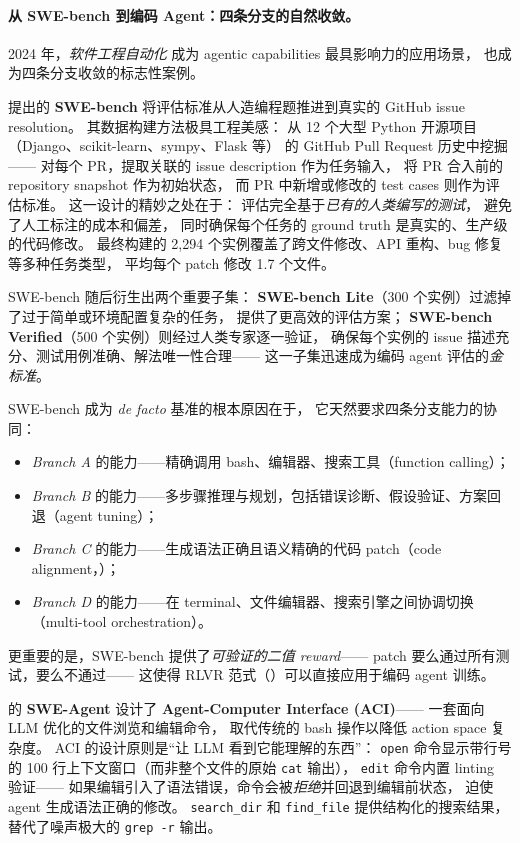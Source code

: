 \paragraph{从 SWE-bench 到编码 Agent：四条分支的自然收敛。}
2024 年，\emph{软件工程自动化} 成为 agentic capabilities 最具影响力的应用场景，
也成为四条分支收敛的标志性案例。

 提出的 \textbf{SWE-bench}
将评估标准从人造编程题推进到真实的 GitHub issue resolution。
其数据构建方法极具工程美感：
从 12 个大型 Python 开源项目（Django、scikit-learn、sympy、Flask 等）
的 GitHub Pull Request 历史中挖掘——
对每个 PR，提取关联的 issue description 作为任务输入，
将 PR 合入前的 repository snapshot 作为初始状态，
而 PR 中新增或修改的 test cases 则作为评估标准。
这一设计的精妙之处在于：
评估完全基于\emph{已有的人类编写的测试}，
避免了人工标注的成本和偏差，
同时确保每个任务的 ground truth 是真实的、生产级的代码修改。
最终构建的 2,294 个实例覆盖了跨文件修改、API 重构、bug 修复等多种任务类型，
平均每个 patch 修改 1.7 个文件。

SWE-bench 随后衍生出两个重要子集：
\textbf{SWE-bench Lite}（300 个实例）过滤掉了过于简单或环境配置复杂的任务，
提供了更高效的评估方案；
\textbf{SWE-bench Verified}（500 个实例）则经过人类专家逐一验证，
确保每个实例的 issue 描述充分、测试用例准确、解法唯一性合理——
这一子集迅速成为编码 agent 评估的\emph{金标准}。

SWE-bench 成为 \emph{de facto} 基准的根本原因在于，
它天然要求四条分支能力的协同：
\begin{itemize}[leftmargin=*]
  \item \emph{Branch A} 的能力——精确调用 bash、编辑器、搜索工具（function calling）；
  \item \emph{Branch B} 的能力——多步骤推理与规划，包括错误诊断、假设验证、方案回退（agent tuning）；
  \item \emph{Branch C} 的能力——生成语法正确且语义精确的代码 patch（code alignment，）；
  \item \emph{Branch D} 的能力——在 terminal、文件编辑器、搜索引擎之间协调切换（multi-tool orchestration）。
\end{itemize}
更重要的是，SWE-bench 提供了\emph{可验证的二值 reward}——
patch 要么通过所有测试，要么不通过——
这使得 RLVR 范式（）可以直接应用于编码 agent 训练。

\citet{yang2024sweagent} 的 \textbf{SWE-Agent}
设计了 \textbf{Agent-Computer Interface (ACI)}——
一套面向 LLM 优化的文件浏览和编辑命令，
取代传统的 bash 操作以降低 action space 复杂度。
ACI 的设计原则是``让 LLM 看到它能理解的东西''：
\texttt{open} 命令显示带行号的 100 行上下文窗口（而非整个文件的原始 \texttt{cat} 输出），
\texttt{edit} 命令内置 linting 验证——
如果编辑引入了语法错误，命令会被\emph{拒绝}并回退到编辑前状态，
迫使 agent 生成语法正确的修改。
\texttt{search\_dir} 和 \texttt{find\_file} 提供结构化的搜索结果，
替代了噪声极大的 \texttt{grep -r} 输出。

